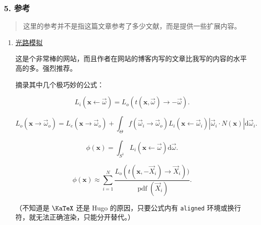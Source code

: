 \documentclass[
]{article}
\begin{document}
\hypertarget{5-ux53c2ux8003}{%
\subsubsection{5. 参考}\label{5-ux53c2ux8003}}

\begin{quote}
这里的参考并不是指这篇文章参考了多少文献，而是提供一些扩展内容。
\end{quote}

\begin{enumerate}
\def\labelenumi{\arabic{enumi}.}
\item
  \href{https://benedikt-bitterli.me/tantalum/tantalum.html}{光路模拟}

  这是个非常棒的网站，而且作者在网站的博客内写的文章比我写的内容的水平高的多。强烈推荐。

  摘录其中几个极巧妙的公式：

  \[L_i(\mathbf{x}\leftarrow\vec{\omega})=L_o(t(\mathbf{x},\vec{\omega})\rightarrow-\vec{\omega}).\]

  \[L_o(\mathbf{x}\rightarrow\vec{\omega}_o)=L_e(\mathbf{x}\rightarrow\vec{\omega}_o)+\int_\Theta f(\vec{\omega}_i\rightarrow\vec{\omega}_o)L_i(\mathbf{x} \leftarrow\vec{\omega}_i)|\vec{\omega}_i\cdot N(\mathbf{x})|\mathrm{d}\vec{\omega}_i.\]

  \[\phi(\mathbf{x})=\int_{S^1}L_i(\mathbf{x}\leftarrow\vec{\omega})\mathrm{d}\vec{\omega}.\]

  \[\phi(\mathbf{x})\approx\sum_{i=1}^N\frac{L_o(t(\mathbf{x},-\vec{X}_i)\rightarrow\vec{X}_i))}{\operatorname{pdf}(\vec{X}_i)}.\]

  （不知道是 \(\KaTeX\) 还是 Hugo 的原因，只要公式内有 \texttt{aligned}
  环境或换行符，就无法正确渲染，只能分开替代。）
\end{enumerate}
\end{document}
